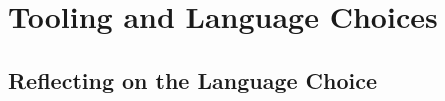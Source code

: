 \section{Tooling and Language Choices} %
\label{sec:tooling_and_language_choices}

\subsection{Reflecting on the Language Choice} %
\label{sub:reflecting_on_the_language_choice}



